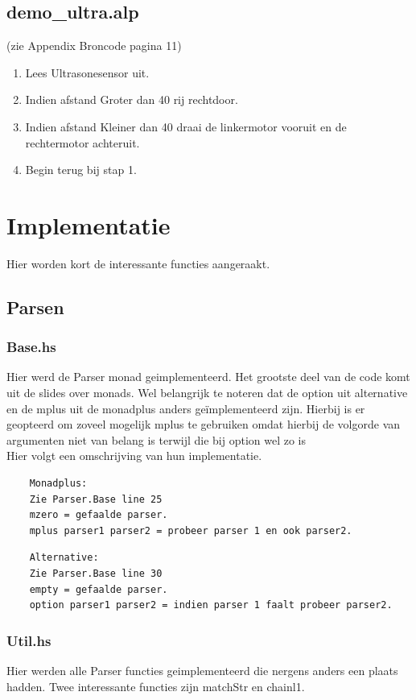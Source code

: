 \documentclass[a4paper,10pt]{article}
\begin{document}
  
  \subsection{demo\_ultra.alp}
  (zie Appendix Broncode pagina 11)
  \begin{enumerate}
   \item Lees Ultrasonesensor uit.
   \item Indien afstand Groter dan 40 rij rechtdoor.
   \item Indien afstand Kleiner dan 40 draai de linkermotor vooruit en de rechtermotor achteruit.
   \item Begin terug bij stap 1.
  \end{enumerate}
 
  


\section{Implementatie}

  Hier worden kort de interessante functies aangeraakt.
  \subsection{Parsen}
    \subsubsection{Base.hs}
    Hier werd de Parser monad geimplementeerd. Het grootste deel van de code komt uit de slides over monads.
    Wel belangrijk te noteren dat de option uit alternative en de mplus uit de monadplus anders geïmplementeerd zijn.
    Hierbij is er geopteerd om zoveel mogelijk mplus te gebruiken omdat hierbij de volgorde van argumenten niet van belang is terwijl die bij option wel zo is\\
    Hier volgt een omschrijving van hun implementatie.

      \begin{lstlisting}
    Monadplus:
    Zie Parser.Base line 25
    mzero = gefaalde parser.
    mplus parser1 parser2 = probeer parser 1 en ook parser2.
      \end{lstlisting}

      \begin{lstlisting}
    Alternative:
    Zie Parser.Base line 30
    empty = gefaalde parser.
    option parser1 parser2 = indien parser 1 faalt probeer parser2.
      \end{lstlisting}
    \subsubsection{Util.hs}
      Hier werden alle Parser functies geimplementeerd die nergens anders een plaats hadden.
      Twee interessante functies zijn matchStr en chainl1.
      
\end{document}
